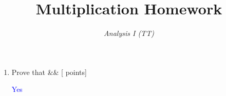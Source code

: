 \documentclass[12pt]{article}
\title{\vspace{-1cm}\textbf{Multiplication Homework}}
\author{\textit{Analysis I (TT)}}
\newcommand{\points}[1]{\hfill {[#1 points]}}
\newcommand{\problem}[2][]{%
  \item {#2}%
  \ifx&#1&%
  \else%
    \points{#1}%
  \fi
  \par\vspace{0.5em}
}
\begin{document}
\maketitle
\vspace{-1em}

\newenvironment{justifiedproof}{%
  \begin{tabular}{@{}p{0.6\linewidth}@{\quad}p{0.12\linewidth}@{}}%
}{\end{tabular}}

\begin{enumerate}[leftmargin=*, label=\textbf{\arabic*.}]


    \problem{Prove that}
        	\textcolor{blue}{Yes}

\end{enumerate}
\end{document}
